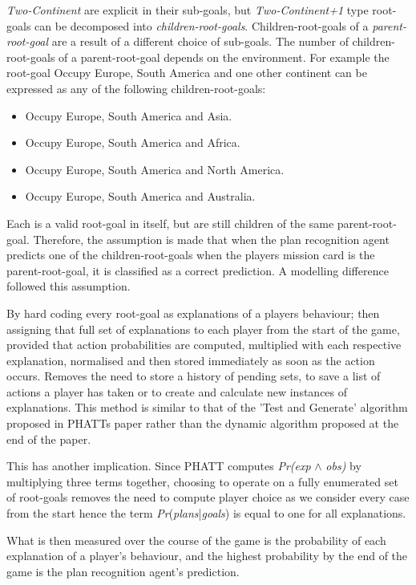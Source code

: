 \documentclass[parskip]{cs4rep}
\begin{document}
\textit{Two-Continent} are explicit in their sub-goals, but \textit{Two-Continent+1} type root-goals can be decomposed into \textit{children-root-goals}. Children-root-goals of a \textit{parent-root-goal} are a result of a different choice of sub-goals. The number of children-root-goals of a parent-root-goal depends on the environment. For example the root-goal Occupy Europe, South America and one other continent can be expressed as any of the following children-root-goals:

\begin{itemize}
\item
Occupy Europe, South America and Asia.
\item
Occupy Europe, South America and Africa.
\item
Occupy Europe, South America and North America.
\item
Occupy Europe, South America and Australia.\newline
\end{itemize}

Each is a valid root-goal in itself, but are still children of the same parent-root-goal. Therefore, the assumption is made that when the plan recognition agent predicts one of the children-root-goals when the players mission card is the parent-root-goal, it is classified as a correct prediction. A modelling difference followed this assumption. 

By hard coding every root-goal as explanations of a players behaviour; then assigning that full set of explanations to each player from the start of the game, provided that action probabilities are computed, multiplied with each respective explanation, normalised and then stored immediately as soon as the action occurs. Removes the need to store a history of pending sets, to save a list of actions a player has taken or to create and calculate new instances of explanations. This method is similar to that of the 'Test and Generate' algorithm proposed in PHATTs paper rather than the dynamic algorithm proposed at the end of the paper.

This has another implication. Since PHATT computes \textit{Pr(exp} $\wedge$ \textit{obs)} by multiplying three terms together, choosing to operate on a fully enumerated set of root-goals removes the need to compute player choice as we consider every case from the start hence the term \textit{Pr}(\textit{plans}|\textit{goals}) is equal to one for all explanations.

What is then measured over the course of the game is the probability of each explanation of a player’s behaviour, and the highest probability by the end of the game is the plan recognition agent’s prediction.
\end{document}
